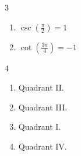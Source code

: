 \documentclass{ximera}
\begin{document}
\begin{multicols}{3}

\begin{enumerate}

\setcounter{enumi}{\value{HW}}

\item $\csc \left( \frac{\pi}{2} \right) = 1$ 
\item $\cot \left( \frac{3\pi}{4} \right) = -1$

\setcounter{HW}{\value{enumi}}

\end{enumerate}

\end{multicols}

\begin{multicols}{4}

\begin{enumerate}
\setcounter{enumi}{\value{HW}}

\item   Quadrant II.

\item Quadrant III.

\item  Quadrant I.

\item Quadrant IV.


\setcounter{HW}{\value{enumi}}
\end{enumerate}

\end{multicols}
\end{document}
